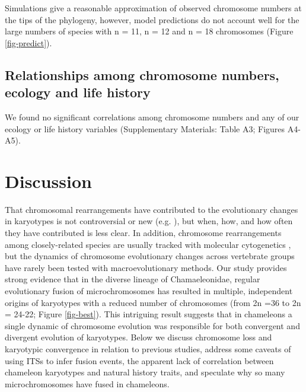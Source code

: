 \documentclass[a4paper, 12pt]{article}
\begin{document}
Simulations give a reasonable approximation of observed chromosome numbers at the tips of the phylogeny, however, model predictions do not account well for the large numbers of species with n = 11, n = 12 and n = 18 chromosomes (Figure \ref{fig-predict}).

\subsection{Relationships among chromosome numbers, ecology and life history}
We found no significant correlations among chromosome numbers and any of our ecology or life history variables (Supplementary Materials: Table A3; Figures A4-A5). 

\section{Discussion}

That chromosomal rearrangements have contributed to the evolutionary changes in karyotypes is not controversial or new (e.g. \citealt{deakin2016anchoring}), but when, how, and how often they have contributed is less clear. 
In addition, chromosome rearrangements among closely-related species are usually tracked with molecular cytogenetics \citep{lisachov2021whole}, but the dynamics of chromosome evolutionary changes across vertebrate groups have rarely been tested with macroevolutionary methods. 
Our study provides strong evidence that in the diverse lineage of Chamaeleonidae, regular evolutionary fusion of microchromosomes has resulted in multiple, independent origins of karyotypes with a reduced number of chromosomes (from 2n =36 to 2n = 24-22; Figure \ref{fig-best}). 
This intriguing result suggests that in chameleons a single dynamic of chromosome evolution was responsible for both convergent and divergent evolution of karyotypes. 
Below we discuss chromosome loss and karyotypic convergence in relation to previous studies, address some caveats of using ITSs to infer fusion events, the apparent lack of correlation between chameleon karyotypes and natural history traits, and speculate why so many microchromosomes have fused in chameleons.    
\end{document}
